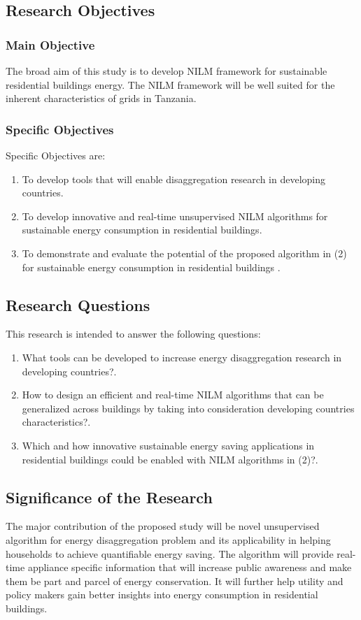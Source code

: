\lipsum[1]
\subsection{Research Objectives}

\subsubsection{Main Objective}

The broad aim of this study is to develop NILM framework for sustainable residential buildings energy. The NILM framework will be well suited for the inherent characteristics of grids in Tanzania.

\subsubsection{Specific Objectives}
Specific Objectives are:
\begin{enumerate}
	\item To develop tools that will enable disaggregation research in developing countries.
	\item To develop innovative and real-time unsupervised NILM algorithms for sustainable energy consumption in residential buildings.
	\item To demonstrate and evaluate the potential of the proposed algorithm in (2) for sustainable
	energy consumption in residential buildings .
\end{enumerate}

\subsection{Research Questions}
This research is intended to answer the following questions:
\begin{enumerate}
	\item What tools can be developed to increase energy disaggregation research in developing countries?.
	\item How to design an efficient and real-time NILM algorithms that can be generalized across buildings  by taking into consideration developing countries characteristics?.
	\item Which and how innovative sustainable energy saving applications in residential buildings could be enabled with NILM algorithms in (2)?.
\end{enumerate}

\subsection{Significance of the Research}
The major contribution of the proposed study will be  novel unsupervised algorithm for energy disaggregation problem and its applicability in helping households to achieve quantifiable energy saving. The algorithm will provide real-time appliance specific information that will increase public awareness and make them be part and parcel of energy conservation. It will further help utility and policy makers gain better insights into energy consumption in residential buildings. 

